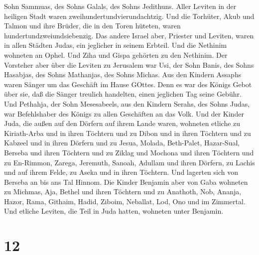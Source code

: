 Sohn Sammuas, des Sohns Galals, des Sohns Jedithuns.  Aller
Leviten in der heiligen Stadt waren zweihundertundvierundachtzig.
 Und die Torhüter, Akub und Talmon und ihre Brüder, die in
den Toren hüteten, waren hundertundzweiundsiebenzig.  Das
andere Israel aber, Priester und Leviten, waren in allen Städten Judas,
ein jeglicher in seinem Erbteil.  Und die Nethinim wohneten
an Ophel. Und Ziha und Gispa gehörten zu den Nethinim.  Der
Vorsteher aber über die Leviten zu Jerusalem war Usi, der Sohn Banis,
des Sohns Hasabjas, des Sohns Mathanjas, des Sohns Michas. Aus den
Kindern Assaphs waren Sänger um das Geschäft im Hause GOttes.
 Denn es war des Königs Gebot über sie, daß die Sänger
treulich handelten, einen jeglichen Tag seine Gebühr.  Und
Pethahja, der Sohn Mesesabeels, aus den Kindern Serahs, des Sohns Judas,
war Befehlshaber des Königs zu allen Geschäften an das Volk.
 Und der Kinder Juda, die außen auf den Dörfern auf ihrem
Lande waren, wohneten etliche zu Kiriath-Arba und in ihren Töchtern und
zu Dibon und in ihren Töchtern und zu Kabzeel und in ihren Dörfern
 und zu Jesua, Molada, Beth-Palet, 
Hazar-Sual, Berseba und ihren Töchtern  und zu Ziklag und
Mochona und ihren Töchtern  und zu En-Rimmon, Zarega,
Jeremuth,  Sanoah, Adullam und ihren Dörfern, zu Lachis und
auf ihrem Felde, zu Aseka und in ihren Töchtern. Und lagerten sich von
Berseba an bis ans Tal Hinnom.  Die Kinder Benjamin aber
von Gaba wohneten zu Michmas, Aja, Bethel und ihren Töchtern
 und zu Anathoth, Nob, Ananja,  Hazor, Rama,
Githaim,  Hadid, Ziboim, Neballat,  Lod, Ono
und im Zimmertal.  Und etliche Leviten, die Teil in Juda
hatten, wohneten unter Benjamin.

\hypertarget{section-11}{%
\section{12}\label{section-11}}

